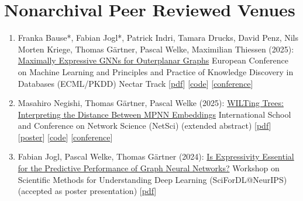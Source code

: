 \documentclass{scrartcl}
\begin{document}
\section{Nonarchival Peer Reviewed Venues}
\begin{enumerate}
\conti
\item
\label{bausejogl2025outerplanarnectar}
Franka Bause*, Fabian Jogl*, Patrick Indri, Tamara Drucks, David Penz, Nils Morten Kriege, Thomas Gärtner, Pascal Welke, Maximilian Thiessen (2025):\newline
\href{https://pwelke.de/publications/bause2023outerplanarnectar.pdf}{Maximally Expressive GNNs for Outerplanar Graphs}\newline
European Conference on Machine Learning and Principles and Practice of Knowledge Discovery in Databases (ECML/PKDD) Nectar Track\newline
{\footnotesize
[\href{https://pwelke.de/publications/bause2023outerplanarnectar.pdf}{pdf}]
[\href{https://github.com/ocatias/outerplanarGNN}{code}]
[\href{https://ecmlpkdd.org/2025/submissions-nectar-track/}{conference}]
}
\item
\label{negishi2024wiltingtreesnetsci}
Masahiro Negishi, Thomas Gärtner, Pascal Welke (2025):\newline
\href{https://pwelke.de/publications/negishi2025netsci.pdf}{WILTing Trees: Interpreting the Distance Between MPNN Embeddings}\newline
International School and Conference on Network Science (NetSci)\newline
(extended abstract)\newline
{\footnotesize
[\href{https://pwelke.de/publications/negishi2025netsci.pdf}{pdf}]
[\href{https://pwelke.de/publications/negishi2025netsciposter.pdf}{poster}]
[\href{https://github.com/masahiro-negishi/wilt}{code}]
[\href{https://netsci2025.github.io/}{conference}]
}
\item
\label{jogl2024expressivitynotessential}
Fabian Jogl, Pascal Welke, Thomas Gärtner (2024):\newline
\href{https://pwelke.de/publications/jogl2024expressivitynotessential.pdf}{Is Expressivity Essential for the Predictive Performance of Graph Neural Networks?}\newline
Workshop on Scientific Methods for Understanding Deep Learning (SciForDL@NeurIPS)\newline
(accepted as poster presentation)\newline
{\footnotesize
[\href{https://pwelke.de/publications/jogl2024expressivitynotessential.pdf}{pdf}]
}
\end{enumerate}
\end{document}
